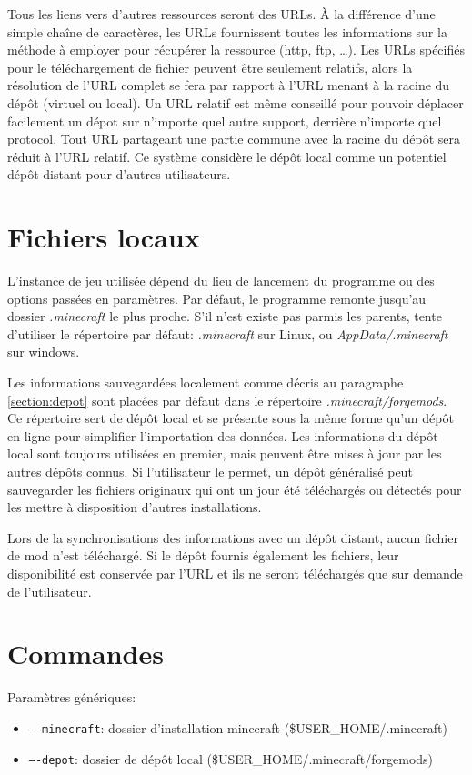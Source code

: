 \documentclass{article}
\begin{document}
Tous les liens vers d'autres ressources seront des URLs.
À la différence d'une simple chaîne de caractères, les URLs fournissent toutes les informations sur la méthode à employer pour récupérer la ressource (http, ftp, \dots).
Les URLs spécifiés pour le téléchargement de fichier peuvent être seulement relatifs, alors la résolution de l'URL complet se fera par rapport à l'URL menant à la racine du dépôt (virtuel ou local).
Un URL relatif est même conseillé pour pouvoir déplacer facilement un dépot sur n'importe quel autre support, derrière n'importe quel protocol.
Tout URL partageant une partie commune avec la racine du dépôt sera réduit à l'URL relatif.
Ce système considère le dépôt local comme un potentiel dépôt distant pour d'autres utilisateurs.







\section{Fichiers locaux}
L'instance de jeu utilisée dépend du lieu de lancement du programme ou des options passées en paramètres.
Par défaut, le programme remonte jusqu'au dossier \textit{.minecraft} le plus proche.
S'il n'est existe pas parmis les parents, tente d'utiliser le répertoire par défaut: \textit{.minecraft} sur Linux, ou \textit{AppData/.minecraft} sur windows.

Les informations sauvegardées localement comme décris au paragraphe \ref{section:depot} sont placées par défaut dans le répertoire \textit{.minecraft/forgemods}.
Ce répertoire sert de dépôt local et se présente sous la même forme qu'un dépôt en ligne pour simplifier l'importation des données.
Les informations du dépôt local sont toujours utilisées en premier, mais peuvent être mises à jour par les autres dépôts connus.
Si l'utilisateur le permet, un dépôt généralisé peut sauvegarder les fichiers originaux qui ont un jour été téléchargés ou détectés pour les mettre à disposition d'autres installations.

Lors de la synchronisations des informations avec un dépôt distant, aucun fichier de mod n'est téléchargé.
Si le dépôt fournis également les fichiers, leur disponibilité est conservée par l'URL et ils ne seront téléchargés que sur demande de l'utilisateur.


\section{Commandes}
Paramètres génériques:
\begin{itemize}
    \item \texttt{----minecraft}: dossier d'installation minecraft (\$USER\_HOME/.minecraft)
    \item \texttt{----depot}: dossier de dépôt local (\$USER\_HOME/.minecraft/forgemods)
\end{itemize}
\end{document}
